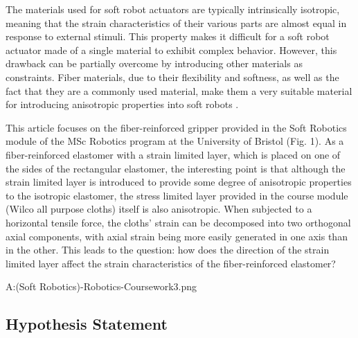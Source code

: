 \documentclass[conference]{IEEEtran}
\begin{document}
The materials used for soft robot actuators are typically intrinsically isotropic, meaning that the strain characteristics of their various parts are almost equal in response to external stimuli. This property makes it difficult for a soft robot actuator made of a single material to exhibit complex behavior. However, this drawback can be partially overcome by introducing other materials as constraints. Fiber materials, due to their flexibility and softness, as well as the fact that they are a commonly used material, make them a very suitable material for introducing anisotropic properties into soft robots \cite{overview}.



This article focuses on the fiber-reinforced gripper provided in the Soft Robotics module of the MSc Robotics program at the University of Bristol (Fig. 1). As a fiber-reinforced elastomer with a strain limited layer\cite{stress_constraint_layer}, which is placed on one of the sides of the rectangular elastomer, the interesting point is that although the strain limited layer is introduced to provide some degree of anisotropic properties to the isotropic elastomer, the stress limited layer provided in the course module  (Wilco all purpose cloths) itself is also anisotropic. When subjected to a horizontal tensile force, the cloths' strain can be decomposed into two orthogonal axial components, with axial strain being more easily generated in one axis than in the other. This leads to the question: how does the direction of the strain limited layer affect the strain characteristics of the fiber-reinforced elastomer?

A:\OneDrive\MScRobotics\SR (Soft Robotics)\Soft-Robotics-Coursework\pics{}3.png



\subsection{Hypothesis Statement}
\end{document}
